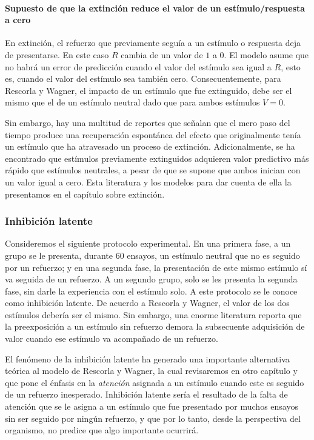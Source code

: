 \documentclass[
  letterpaper,
]{book}
\let\oldparagraph\paragraph
\renewcommand{\paragraph}[1]{\oldparagraph{#1}\mbox{}}
\begin{document}
\paragraph{Supuesto de que la extinción reduce el valor de un
estímulo/respuesta a
cero}\label{supuesto-de-que-la-extinciuxf3n-reduce-el-valor-de-un-estuxedmulorespuesta-a-cero}

En extinción, el refuerzo que previamente seguía a un estímulo o
respuesta deja de presentarse. En este caso \(R\) cambia de un valor de
\(1\) a \(0\). El modelo asume que no habrá un error de predicción
cuando el valor del estímulo sea igual a \(R\), esto es, cuando el valor
del estímulo sea también cero. Consecuentemente, para Rescorla y Wagner,
el impacto de un estímulo que fue extinguido, debe ser el mismo que el
de un estímulo neutral dado que para ambos estímulos \(V = 0\).

Sin embargo, hay una multitud de reportes que señalan que el mero paso
del tiempo produce una recuperación espontánea del efecto que
originalmente tenía un estímulo que ha atravesado un proceso de
extinción. Adicionalmente, se ha encontrado que estímulos previamente
extinguidos adquieren valor predictivo más rápido que estímulos
neutrales, a pesar de que se supone que ambos inician con un valor igual
a cero. Esta literatura y los modelos para dar cuenta de ella la
presentamos en el capítulo sobre extinción.

\subsubsection{Inhibición latente}\label{inhibiciuxf3n-latente}

Consideremos el siguiente protocolo experimental. En una primera fase, a
un grupo se le presenta, durante 60 ensayos, un estímulo neutral que no
es seguido por un refuerzo; y en una segunda fase, la presentación de
este mismo estímulo sí va seguida de un refuerzo. A un segundo grupo,
solo se les presenta la segunda fase, sin darle la experiencia con el
estímulo solo. A este protocolo se le conoce como inhibición latente. De
acuerdo a Rescorla y Wagner, el valor de los dos estímulos debería ser
el mismo. Sin embargo, una enorme literatura reporta que la
preexposición a un estímulo sin refuerzo demora la subsecuente
adquisición de valor cuando ese estímulo va acompañado de un refuerzo.

El fenómeno de la inhibición latente ha generado una importante
alternativa teórica al modelo de Rescorla y Wagner, la cual revisaremos
en otro capítulo y que pone el énfasis en la \emph{atención} asignada a
un estímulo cuando este es seguido de un refuerzo inesperado. Inhibición
latente sería el resultado de la falta de atención que se le asigna a un
estímulo que fue presentado por muchos ensayos sin ser seguido por
ningún refuerzo, y que por lo tanto, desde la perspectiva del organismo,
no predice que algo importante ocurrirá.
\end{document}
